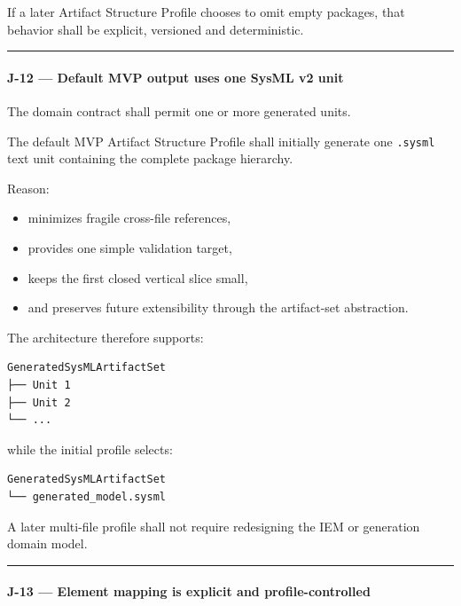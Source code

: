 If a later Artifact Structure Profile chooses to omit empty packages, that behavior shall be explicit, versioned and deterministic.

\begin{center}\rule{0.5\linewidth}{0.5pt}\end{center}

\hypertarget{j-12--default-mvp-output-uses-one-sysml-v2-unit}{%
\paragraph{J-12 --- Default MVP output uses one SysML v2 unit}\label{j-12--default-mvp-output-uses-one-sysml-v2-unit}}

The domain contract shall permit one or more generated units.

The default MVP Artifact Structure Profile shall initially generate one \texttt{.sysml} text unit containing the complete package hierarchy.

Reason:

\begin{itemize}
\tightlist
\item
  minimizes fragile cross-file references,
\item
  provides one simple validation target,
\item
  keeps the first closed vertical slice small,
\item
  and preserves future extensibility through the artifact-set abstraction.
\end{itemize}

The architecture therefore supports:

\begin{verbatim}
GeneratedSysMLArtifactSet
├── Unit 1
├── Unit 2
└── ...
\end{verbatim}

while the initial profile selects:

\begin{verbatim}
GeneratedSysMLArtifactSet
└── generated_model.sysml
\end{verbatim}

A later multi-file profile shall not require redesigning the IEM or generation domain model.

\begin{center}\rule{0.5\linewidth}{0.5pt}\end{center}

\hypertarget{j-13--element-mapping-is-explicit-and-profile-controlled}{%
\paragraph{J-13 --- Element mapping is explicit and profile-controlled}\label{j-13--element-mapping-is-explicit-and-profile-controlled}}


